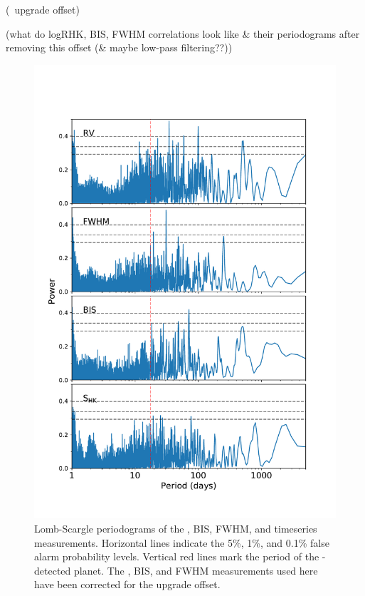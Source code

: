 \documentclass[modern]{aastex62}
\begin{document}
(\HARPS\ upgrade offset)

(what do logRHK, BIS, FWHM correlations look like \& their periodograms after removing this offset (\& maybe low-pass filtering??))

\begin{figure}
    \centering
    \includegraphics[width=\textwidth]{periodograms.pdf}
    \caption{Lomb-Scargle periodograms of the \HARPS \RV, BIS, FWHM, and \shk timeseries measurements. Horizontal lines indicate the 5\%, 1\%, and 0.1\% false alarm probability levels. Vertical red lines mark the period of the \TESS-detected planet. The \RV, BIS, and FWHM measurements used here have been corrected for the \HARPS upgrade offset.}
    \label{fig:periodograms}
\end{figure}
\end{document}
